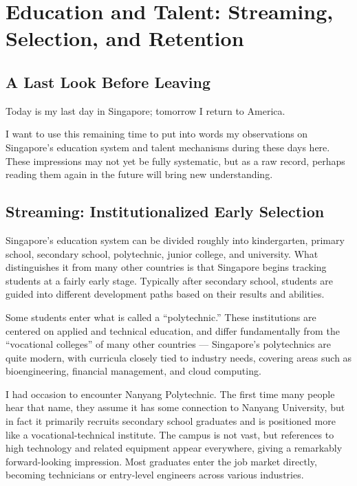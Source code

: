 \chapter{Education and Talent: Streaming, Selection, and Retention}

\section{A Last Look Before Leaving}

Today is my last day in Singapore; tomorrow I return to America.

I want to use this remaining time to put into words my observations on Singapore's education system and talent mechanisms during these days here. These impressions may not yet be fully systematic, but as a raw record, perhaps reading them again in the future will bring new understanding.

\section{Streaming: Institutionalized Early Selection}

Singapore's education system can be divided roughly into kindergarten, primary school, secondary school, polytechnic, junior college, and university. What distinguishes it from many other countries is that Singapore begins tracking students at a fairly early stage. Typically after secondary school, students are guided into different development paths based on their results and abilities.

Some students enter what is called a ``polytechnic.'' These institutions are centered on applied and technical education, and differ fundamentally from the ``vocational colleges'' of many other countries --- Singapore's polytechnics are quite modern, with curricula closely tied to industry needs, covering areas such as bioengineering, financial management, and cloud computing.

I had occasion to encounter Nanyang Polytechnic. The first time many people hear that name, they assume it has some connection to Nanyang University, but in fact it primarily recruits secondary school graduates and is positioned more like a vocational-technical institute. The campus is not vast, but references to high technology and related equipment appear everywhere, giving a remarkably forward-looking impression. Most graduates enter the job market directly, becoming technicians or entry-level engineers across various industries.


